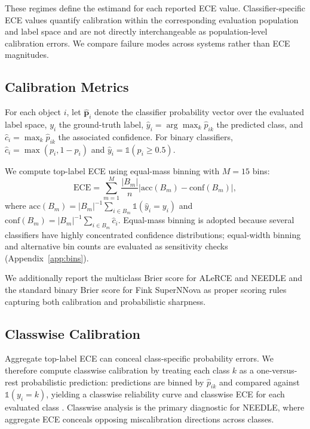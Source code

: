 \documentclass[twocolumn]{aastex631}
\begin{document}
These regimes define the estimand for each reported ECE value.
Classifier-specific ECE values quantify calibration within the
corresponding evaluation population and label space and are not
directly interchangeable as population-level calibration errors.
We compare failure modes across systems rather than ECE magnitudes.

\subsection{Calibration Metrics}\label{sec:cal_metrics}

For each object $i$, let $\hat{\mathbf{p}}_i$ denote the
classifier probability vector over the evaluated label space,
$y_i$ the ground-truth label, $\hat{y}_i = \arg\max_k
\hat{p}_{ik}$ the predicted class, and $\hat{c}_i = \max_k
\hat{p}_{ik}$ the associated confidence. For binary classifiers,
$\hat{c}_i = \max(p_i, 1-p_i)$ and $\hat{y}_i =
\mathbb{1}(p_i \geq 0.5)$.

We compute top-label ECE using equal-mass binning with $M = 15$
bins:
%
\begin{equation}
    \mathrm{ECE} = \sum_{m=1}^{M} \frac{|B_m|}{n}
    \left| \mathrm{acc}(B_m) - \mathrm{conf}(B_m) \right|,
    \label{eq:ece_methods}
\end{equation}
%
where $\mathrm{acc}(B_m) = |B_m|^{-1} \sum_{i \in B_m}
\mathbb{1}(\hat{y}_i = y_i)$ and $\mathrm{conf}(B_m) =
|B_m|^{-1} \sum_{i \in B_m} \hat{c}_i$. Equal-mass binning is
adopted because several classifiers have highly concentrated
confidence distributions; equal-width binning and alternative bin
counts are evaluated as sensitivity checks
(Appendix~\ref{app:bins}).

We additionally report the multiclass Brier score
\citep{brier1950} for ALeRCE and NEEDLE and the standard binary
Brier score for Fink SuperNNova as proper scoring rules capturing
both calibration and probabilistic sharpness.

\subsection{Classwise Calibration}\label{sec:classwise_methods}

Aggregate top-label ECE can conceal class-specific probability
errors. We therefore compute classwise calibration by treating
each class $k$ as a one-versus-rest probabilistic prediction:
predictions are binned by $\hat{p}_{ik}$ and compared against
$\mathbb{1}(y_i = k)$, yielding a classwise reliability curve
and classwise ECE for each evaluated class \citep{nixon2019}.
Classwise analysis is the primary diagnostic for NEEDLE, where
aggregate ECE conceals opposing miscalibration directions across
classes.
\end{document}
